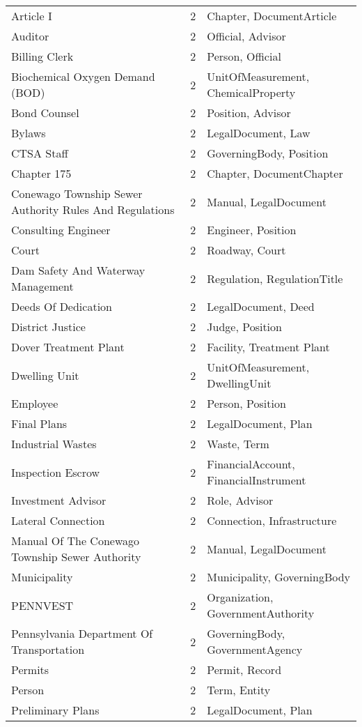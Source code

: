 \begin{longtable}{p{} p{} p{}}
Article I & 2 & Chapter, DocumentArticle \\
Auditor & 2 & Official, Advisor \\
Billing Clerk & 2 & Person, Official \\
Biochemical Oxygen Demand (BOD) & 2 & UnitOfMeasurement, ChemicalProperty \\
Bond Counsel & 2 & Position, Advisor \\
Bylaws & 2 & LegalDocument, Law \\
CTSA Staff & 2 & GoverningBody, Position \\
Chapter 175 & 2 & Chapter, DocumentChapter \\
Conewago Township Sewer Authority Rules And Regulations & 2 & Manual, LegalDocument \\
Consulting Engineer & 2 & Engineer, Position \\
Court & 2 & Roadway, Court \\
Dam Safety And Waterway Management & 2 & Regulation, RegulationTitle \\
Deeds Of Dedication & 2 & LegalDocument, Deed \\
District Justice & 2 & Judge, Position \\
Dover Treatment Plant & 2 & Facility, Treatment Plant \\
Dwelling Unit & 2 & UnitOfMeasurement, DwellingUnit \\
Employee & 2 & Person, Position \\
Final Plans & 2 & LegalDocument, Plan \\
Industrial Wastes & 2 & Waste, Term \\
Inspection Escrow & 2 & FinancialAccount, FinancialInstrument \\
Investment Advisor & 2 & Role, Advisor \\
Lateral Connection & 2 & Connection, Infrastructure \\
Manual Of The Conewago Township Sewer Authority & 2 & Manual, LegalDocument \\
Municipality & 2 & Municipality, GoverningBody \\
PENNVEST & 2 & Organization, GovernmentAuthority \\
Pennsylvania Department Of Transportation & 2 & GoverningBody, GovernmentAgency \\
Permits & 2 & Permit, Record \\
Person & 2 & Term, Entity \\
Preliminary Plans & 2 & LegalDocument, Plan \\

\end{longtable}

